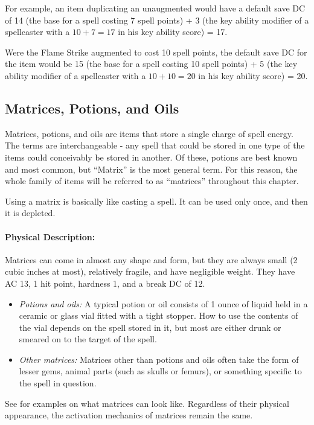 For example, an item duplicating an unaugmented  would have a default save DC of 14 (the base for a spell costing 7 spell points) + 3 (the key ability modifier of a spellcaster with a $10 + 7 = 17$ in his key ability score) = 17.

Were the Flame Strike augmented to cost 10 spell points, the default save DC for the item would be 15 (the base for a spell costing 10 spell points) + 5 (the key ability modifier of a spellcaster with a $10 + 10 = 20$ in his key ability score) = 20.

\subsection{Matrices, Potions, and Oils}
\label{Item:Matrices}
Matrices, potions, and oils are items that store a single charge of spell energy.
The terms are interchangeable - any spell that could be stored in one type of the items could conceivably be stored in another.
Of these, potions are best known and most common, but ``Matrix'' is the most general term. 
For this reason, the whole family of items will be referred to as ``matrices'' throughout this chapter.

Using a matrix is basically like casting a spell.
It can be used only once, and then it is depleted.

\paragraph{Physical Description:}
Matrices can come in almost any shape and form, but they are always small (2 cubic inches at most), relatively fragile, and have negligible weight.
They have AC 13, 1 hit point, hardness 1, and a break DC of 12.
\begin{itemize}
 \item \emph{Potions and oils:} A typical potion or oil consists of 1 ounce of liquid held in a ceramic or glass vial fitted with a tight stopper. How to use the contents of the vial depends on the spell stored in it, but most are either drunk or smeared on to the target of the spell.
 \item \emph{Other matrices:} Matrices other than potions and oils often take the form of lesser gems, animal parts (such as skulls or femurs), or something specific to the spell in question.
\end{itemize}
See  for examples on what matrices can look like.
Regardless of their physical appearance, the activation mechanics of matrices remain the same.

